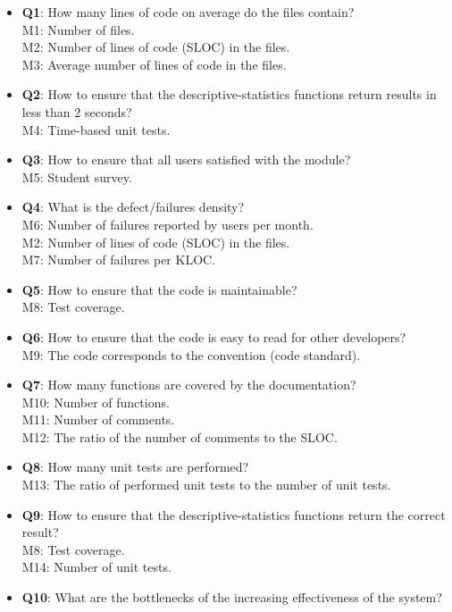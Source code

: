 \documentclass[12pt]{article}
\begin{document}
\begin{itemize}
    \item \textbf{Q1}: How many lines of code on average do the files contain?\\
     M1: Number of files.\\
     M2: Number of lines of code (SLOC) in the files.\\
     M3: Average number of lines of code in the files. 
    \item \textbf{Q2}: How to ensure that the descriptive-statistics functions return results in less than 2 seconds? \\
     M4: Time-based unit tests.
    \item \textbf{Q3}: How to ensure that all users satisfied with the module?\\
     M5: Student survey.
    \item \textbf{Q4}: What is the defect/failures density?\\
     M6: Number of failures reported by users per month.\\
     M2: Number of lines of code (SLOC) in the files.\\
     M7: Number of failures per KLOC.
    \item \textbf{Q5}: How to ensure that the code is maintainable?\\
     M8: Test coverage.
    \item \textbf{Q6}: How to ensure that the code is easy to read for other developers?\\
     M9: The code corresponds to the convention (code standard).
    \item \textbf{Q7}: How many functions are covered by the documentation?\\
     M10: Number of functions.\\
     M11: Number of comments.\\
     M12: The ratio of the number of comments to the SLOC.
    \item \textbf{Q8}: How many unit tests are performed?\\
     M13: The ratio of performed unit tests to the number of unit tests.
    \item \textbf{Q9}: How to ensure that the descriptive-statistics functions return the correct result?\\
     M8: Test coverage.\\
     M14: Number of unit tests.
    \item \textbf{Q10}: What are the bottlenecks of the increasing effectiveness of the system?\\

\end{itemize}
\end{document}
